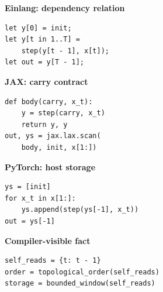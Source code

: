 \begin{minipage}[t]{0.48\linewidth}
\textbf{Einlang: dependency relation}
\begin{lstlisting}[style=einlang,basicstyle=\ttfamily\footnotesize]
let y[0] = init;
let y[t in 1..T] =
    step(y[t - 1], x[t]);
let out = y[T - 1];
\end{lstlisting}
\end{minipage}
\hfill
\begin{minipage}[t]{0.48\linewidth}
\textbf{JAX: carry contract}
\begin{lstlisting}[style=pythoncode,basicstyle=\ttfamily\footnotesize]
def body(carry, x_t):
    y = step(carry, x_t)
    return y, y
out, ys = jax.lax.scan(
    body, init, x[1:])
\end{lstlisting}
\end{minipage}

\vspace{0.45\baselineskip}
\begin{minipage}[t]{0.48\linewidth}
\textbf{PyTorch: host storage}
\begin{lstlisting}[style=pythoncode,basicstyle=\ttfamily\footnotesize]
ys = [init]
for x_t in x[1:]:
    ys.append(step(ys[-1], x_t))
out = ys[-1]
\end{lstlisting}
\end{minipage}
\hfill
\begin{minipage}[t]{0.48\linewidth}
\textbf{Compiler-visible fact}
\begin{lstlisting}[style=pythoncode,basicstyle=\ttfamily\footnotesize]
self_reads = {t: t - 1}
order = topological_order(self_reads)
storage = bounded_window(self_reads)
\end{lstlisting}
\end{minipage}
